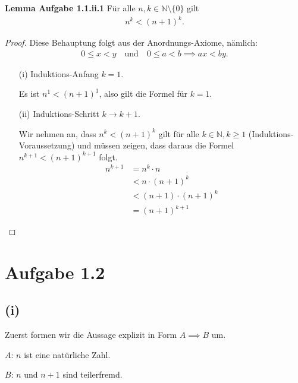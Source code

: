 \documentclass{article}
\begin{document}
\textbf{Lemma Aufgabe 1.1.ii.1} Für alle
\(n, k \in \mathbb{N} \setminus \{0\}\) gilt
\begin{align*}
n^k < (n+1)^k.
\end{align*}
\begin{proof}
  Diese Behauptung folgt aus der Anordnungs-Axiome, nämlich:
\begin{align*}
0 \leq x < y \quad \text{und} \quad 0 \leq a < b \implies ax < by.
\end{align*}
\begin{itemize}

\item[(i)] Induktions-Anfang \(k=1\).

  Es ist \(n^1 < (n+1)^1\), also gilt die Formel für \(k=1\).

\item[(ii)] Induktions-Schritt \(k \rightarrow k+1\).

  Wir nehmen an, dass \(n^k < (n+1)^k\) gilt für alle
  \(k \in \mathbb{N}, k \geq 1\) (Induktions-Voraussetzung) und müssen
  zeigen, dass daraus die Formel \(n^{k+1} < (n+1)^{k+1}\) folgt.
\begin{align*}
  n^{k+1} &= n^k \cdot n \\
          &< n \cdot (n+1)^k \\
          &< (n+1) \cdot (n+1)^k \\
  &= (n+1)^{k+1}
\end{align*}
\end{itemize}
\end{proof}

\section*{Aufgabe 1.2}
\subsection*{(i)}
Zuerst formen wir die Aussage explizit in Form \(A \implies B\) um.

\(A\): \(n\) ist eine natürliche Zahl.

\(B\): \(n\) und \(n+1\) sind teilerfremd.
\end{document}
